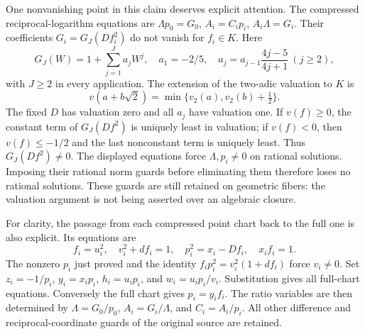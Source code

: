 \documentclass[11pt]{article}
\theoremstyle{definition}
\begin{document}
One nonvanishing point in this claim deserves explicit attention.
The compressed reciprocal-logarithm equations are
$\Lambda p_0=G_0$, $A_i=C_ip_i$, $A_i\Lambda=G_i$.
Their coefficients $G_i=G_J(Df_i^2)$ do not vanish for $f_i\in K$.
Here
\[
 G_J(W)=1+\sum_{j=1}^J a_jW^j,\quad
 a_1=-2/5,\quad a_j=a_{j-1}\frac{4j-5}{4j+1}\ (j\geq2),
\]
with $J\geq2$ in every application.  The extension of the two-adic
valuation to $K$ is
\[
 v(a+b\sqrt2)=\min\{v_2(a),v_2(b)+\tfrac12\}.
\]
The fixed $D$ has valuation zero and all $a_j$ have valuation one.
If $v(f)\geq0$, the constant term of $G_J(Df^2)$ is uniquely least
in valuation; if $v(f)<0$, then $v(f)\leq-1/2$ and the last
nonconstant term is uniquely least.  Thus $G_J(Df^2)\ne0$.
The displayed equations force $\Lambda,p_i\ne0$ on rational solutions.
Imposing their rational norm guards before eliminating them therefore
loses no rational solutions.  These guards are still retained on
geometric fibers: the valuation argument is not being asserted over
an algebraic closure.

For clarity, the passage from each compressed point chart back to the
full one is also explicit.  Its equations are
\[
 f_i=u_i^2,\quad v_i^2+df_i=1,\quad
 p_i^2=x_i-Df_i,\quad x_if_i=1.
\]
The nonzero $p_i$ just proved and the identity
$f_ip_i^2=v_i^2(1+df_i)$ force $v_i\ne0$.
Set $z_i=-1/p_i$, $y_i=x_ip_i$, $h_i=u_ip_i$, and
$w_i=u_ip_i/v_i$.  Substitution gives all full-chart equations.
Conversely the full chart gives $p_i=y_if_i$.
The ratio variables are then determined by
$\Lambda=G_0/p_0$, $A_i=G_i/\Lambda$, and $C_i=A_i/p_i$.
All other difference and reciprocal-coordinate guards of the original
source are retained.
\end{document}
